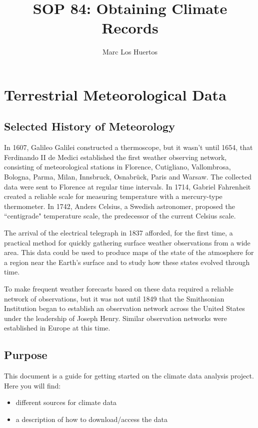 \documentclass{article}\usepackage[]{graphicx}\usepackage[]{color}
\title{SOP 84: Obtaining Climate Records}
\author{Marc Los Huertos}
\begin{document}
\maketitle

\section{Terrestrial Meteorological Data}

\subsection{Selected History of Meteorology}

In 1607, Galileo Galilei constructed a thermoscope, but it wasn't until 1654, that Ferdinando II de Medici established the first weather observing network, consisting of meteorological stations in Florence, Cutigliano, Vallombrosa, Bologna, Parma, Milan, Innsbruck, Osnabrück, Paris and Warsaw. The collected data were sent to Florence at regular time intervals. In 1714, Gabriel Fahrenheit created a reliable scale for measuring temperature with a mercury-type thermometer. In 1742, Anders Celsius, a Swedish astronomer, proposed the ``centigrade" temperature scale, the predecessor of the current Celsius scale.

The arrival of the electrical telegraph in 1837 afforded, for the first time, a practical method for quickly gathering surface weather observations from a wide area. This data could be used to produce maps of the state of the atmosphere for a region near the Earth's surface and to study how these states evolved through time. 

To make frequent weather forecasts based on these data required a reliable network of observations, but it was not until 1849 that the Smithsonian Institution began to establish an observation network across the United States under the leadership of Joseph Henry. Similar observation networks were established in Europe at this time. 

\subsection{Purpose}
This document is a guide for getting started on the climate data analysis project. Here you will find: 
\begin{itemize}
\item different sources for climate data
\item a description of how to download/access the data
\end{itemize}
\end{document}

